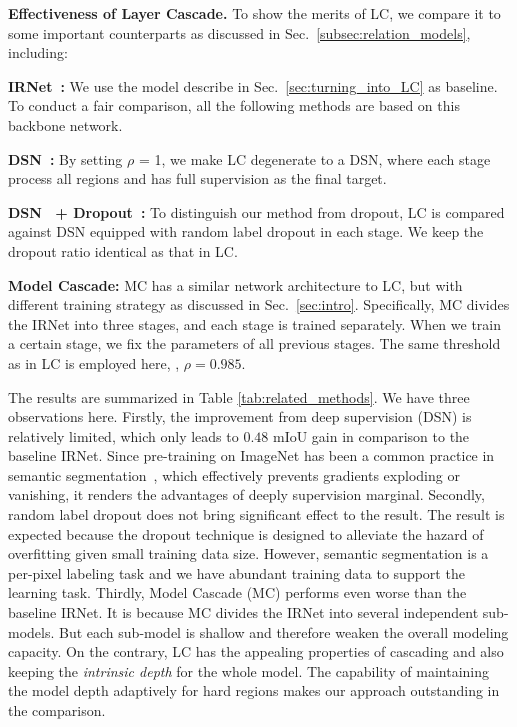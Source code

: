 \documentclass[10pt,twocolumn,letterpaper]{article}
\begin{document}
\vspace{0.1cm}
\noindent
\textbf{Effectiveness of Layer Cascade.}
To show the merits of LC, we compare it to some important counterparts as discussed in Sec.~\ref{subsec:relation_models}, including:
\begin{itemize}
\small{
    \item \textbf{IRNet~\cite{szegedy2016inception}:}
We use the model describe in Sec.~\ref{sec:turning_into_LC} as baseline. 
To conduct a fair comparison, all the following methods are based on this backbone network.
\item \textbf{DSN~\cite{lee2015deeply}:}
By setting $\rho$ = 1, we make LC degenerate to a DSN, where each stage process all regions and has full supervision as the final target.
\item \textbf{DSN~\cite{lee2015deeply} + Dropout~\cite{srivastava2014dropout}:}
To distinguish our method from dropout, LC is compared against DSN equipped with random label dropout in each stage.
We keep the dropout ratio identical as that in LC.
\item \textbf{Model Cascade:}
MC has a similar network architecture to LC, but with different training strategy as discussed in Sec.~\ref{sec:intro}. 
Specifically, MC divides the IRNet into three stages, and each stage is trained separately.
When we train a certain stage, we fix the parameters of all previous stages.
The same threshold as in LC is employed here, \ie, $\rho = 0.985$.  
}
\end{itemize}

The results are summarized in Table \ref{tab:related_methods}. We have three observations here.
Firstly, the improvement from deep supervision (DSN) is relatively limited, which only leads to $0.48$ mIoU gain in comparison to the baseline IRNet.
Since pre-training on ImageNet has been a common practice in semantic segmentation~\cite{long2014fully}, which effectively prevents gradients exploding or vanishing, it renders the advantages of deeply supervision marginal.
Secondly, random label dropout does not bring significant effect to the result.
The result is expected because the dropout technique is designed to alleviate the hazard of overfitting given small training data size.
However, semantic segmentation is a per-pixel labeling task and we have abundant training data to support the learning task.
Thirdly, Model Cascade (MC) performs even worse than the baseline IRNet.
It is because MC divides the IRNet into several independent sub-models. But each sub-model is shallow and therefore weaken the overall modeling capacity.  
On the contrary, LC has the appealing properties of cascading and also keeping the \textit{intrinsic depth} for the whole model. 
The capability of maintaining the model depth adaptively for hard regions makes our approach outstanding in the comparison.
\end{document}
